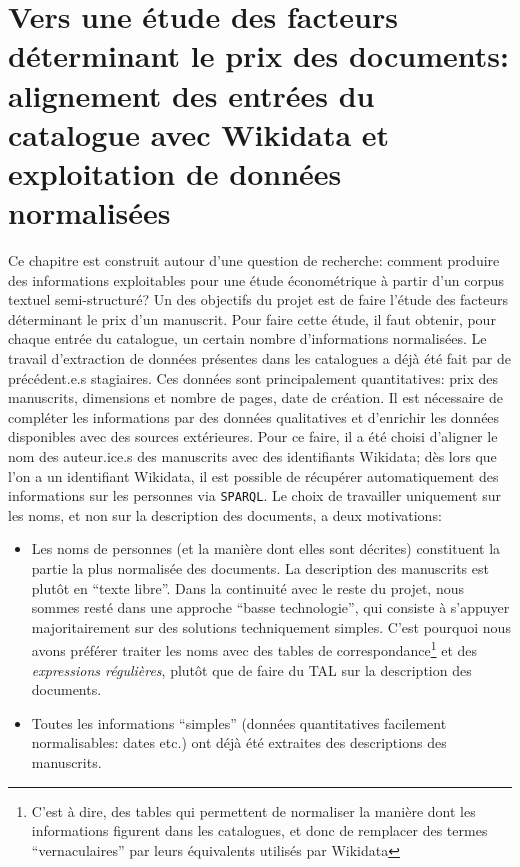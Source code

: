 \documentclass[a4paper, 12pt, twoside]{book}
\newcommand{\rgx}{\textit{expressions régulières}}
\newcommand{\sparql}{\texttt{SPARQL}}
\begin{document}
\chapter{Vers une étude des facteurs déterminant le prix des documents: alignement des entrées du catalogue avec Wikidata et exploitation de données normalisées}
Ce chapitre est construit autour d'une question de recherche: comment produire des informations exploitables pour une étude économétrique à partir d'un corpus textuel semi-structuré? Un des objectifs du projet est de faire l'étude des facteurs déterminant le prix d'un manuscrit. Pour faire cette étude, il faut obtenir, pour chaque entrée du catalogue, un certain nombre d'informations normalisées. Le travail d'extraction de données présentes dans les catalogues a déjà été fait par de précédent.e.s stagiaires. Ces données sont principalement quantitatives: prix des manuscrits, dimensions et nombre de pages, date de création. Il est nécessaire de compléter les informations par des données qualitatives et d'enrichir les données disponibles avec des sources extérieures. Pour ce faire, il a été choisi d'aligner le nom des auteur.ice.s des manuscrits avec des identifiants Wikidata; dès lors que l'on a un identifiant Wikidata, il est possible de récupérer automatiquement des informations sur les personnes via \sparql. Le choix de travailler uniquement sur les noms, et non sur la description des documents, a deux motivations:
\begin{itemize}
	\item Les noms de personnes (et la manière dont elles sont décrites) constituent la partie la plus normalisée des documents. La description des manuscrits est plutôt en \enquote{texte libre}. Dans la continuité avec le reste du projet, nous sommes resté dans une approche \enquote{basse technologie}, qui consiste à s'appuyer majoritairement sur des solutions techniquement simples. C'est pourquoi nous avons préférer traiter les noms avec des tables de correspondance\footnote{C'est à dire, des tables qui permettent de normaliser la manière dont les informations figurent dans les catalogues, et donc de remplacer des termes \enquote{vernaculaires} par leurs équivalents utilisés par Wikidata} et des \rgx{}, plutôt que de faire du TAL sur la description des documents.
	\item Toutes les informations \enquote{simples} (données quantitatives facilement normalisables: dates etc.) ont déjà été extraites des descriptions des manuscrits.
\end{itemize}
\end{document}
